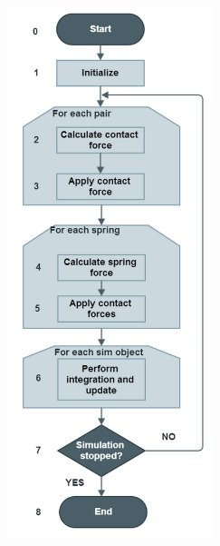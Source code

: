 \begin{figure}
  \centering
    \includegraphics[width=60mm]{sections/methodology/images/basic/sim-algorithm.png}
  \caption[The flow-chart of the simulation update loop.]{\label{sim-algorithm}}
\end{figure}

